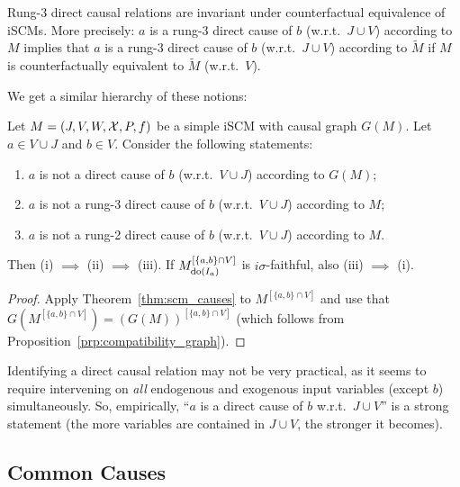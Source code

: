 \begin{Rem}\label{rem:scm_rung3_direct_cause_of_counterfactual_equivalence}
  Rung-3 direct causal relations are invariant under counterfactual equivalence of iSCMs.
  More precisely: $a$ is a rung-3 direct cause of $b$ (w.r.t.\ $J \cup V$) according to $M$ implies that $a$ is a rung-3 direct cause of $b$ (w.r.t.\ $J \cup V$) according to $\tilde{M}$ if $M$ is counterfactually equivalent to $\tilde{M}$ (w.r.t.\ $V$).
\end{Rem}
We get a similar hierarchy of these notions:
\begin{Cor}\label{cor:scm_direct_cause_of}
  Let $M = \left ( J, V, W, \mathcal{X}, P, f \right )$ be a simple iSCM with causal graph $G(M)$.
  Let $a \in V \cup J$ and $b \in V$.
  Consider the following statements:
  \begin{enumerate}
    \item[(i)] $a$ is not a direct cause of $b$ (w.r.t.\ $V \cup J$) according to $G(M)$;
    \item[(ii)] $a$ is not a rung-3 direct cause of $b$ (w.r.t.\ $V \cup J$) according to $M$;
    \item[(iii)] $a$ is not a rung-2 direct cause of $b$ (w.r.t.\ $V \cup J$) according to $M$.
  \end{enumerate}
  Then (i) $\implies$ (ii) $\implies$ (iii). 
  If $M^{[\{a,b\}\cap V]}_{\operatorname{do}(I_a)}$ is $i\sigma$-faithful, also (iii) $\implies$ (i).
\end{Cor}
\begin{proof}
  Apply Theorem~\ref{thm:scm_causes} to $M^{[\{a,b\}\cap V]}$ and use that $G(M^{[\{a,b\}\cap V]}) = (G(M))^{[\{a,b\}\cap V]}$
  (which follows from Proposition~\ref{prp:compatibility_graph}).
\end{proof}
Identifying a direct causal relation may not be very practical, as it seems to require intervening on \emph{all} endogenous and exogenous input variables (except $b$) simultaneously.
So, empirically, ``$a$ is a direct cause of $b$ w.r.t.\ $J \cup V$'' is a strong statement (the more variables are contained in $J \cup V$, the stronger it becomes).

\subsection{Common Causes}

